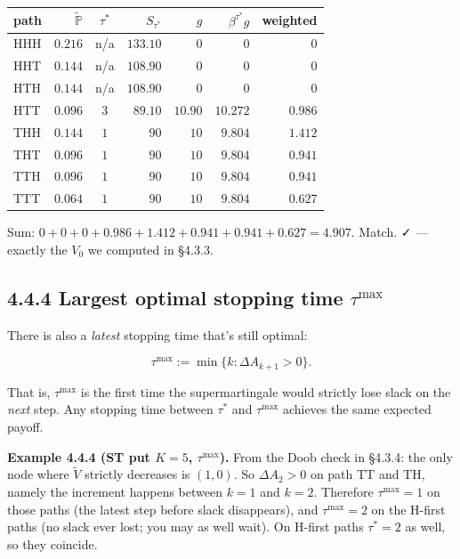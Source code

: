 \documentclass[
  10pt,
  twoside]{book}
\newcounter{none} %
\begin{document}
{\def\LTcaptype{none} %
\begin{table}[H]
\centering
\begin{tabular}{|l|r|c|r|r|r|r|}
\toprule
path & \(\tilde{\mathbb{P}}\) & \(\tau^*\) & \(S_{\tau^*}\) & \(g\) & \(\beta^{\tau^*}g\) & weighted \\
\midrule



HHH & \(0.216\) & n/a & \(133.10\) & \(0\) & \(0\) & \(0\) \\
HHT & \(0.144\) & n/a & \(108.90\) & \(0\) & \(0\) & \(0\) \\
HTH & \(0.144\) & n/a & \(108.90\) & \(0\) & \(0\) & \(0\) \\
HTT & \(0.096\) & \(3\) & \(89.10\) & \(10.90\) & \(10.272\) &
\(0.986\) \\
THH & \(0.144\) & \(1\) & \(90\) & \(10\) & \(9.804\) & \(1.412\) \\
THT & \(0.096\) & \(1\) & \(90\) & \(10\) & \(9.804\) & \(0.941\) \\
TTH & \(0.096\) & \(1\) & \(90\) & \(10\) & \(9.804\) & \(0.941\) \\
TTT & \(0.064\) & \(1\) & \(90\) & \(10\) & \(9.804\) & \(0.627\) \\
\bottomrule
\end{tabular}
\end{table}
}

Sum: \(0 + 0 + 0 + 0.986 + 1.412 + 0.941 + 0.941 + 0.627 = 4.907\).
Match. ✓ --- exactly the \(V_0\) we computed in §4.3.3.

\subsection{\texorpdfstring{4.4.4 Largest optimal stopping time
\(\tau^{\max}\)}{4.4.4 Largest optimal stopping time \textbackslash tau\^{}\{\textbackslash max\}}}\label{largest-optimal-stopping-time-taumax}

There is also a \emph{latest} stopping time that's still optimal:

\[\tau^{\max} := \min\{k : \Delta A_{k+1} > 0\}.\]

That is, \(\tau^{\max}\) is the first time the supermartingale would
strictly lose slack on the \emph{next} step. Any stopping time between
\(\tau^*\) and \(\tau^{\max}\) achieves the same expected payoff.

\textbf{Example 4.4.4 (ST put \(K = 5\), \(\tau^{\max}\)).} From the
Doob check in §4.3.4: the only node where \(\tilde V\) strictly
decreases is \((1, 0)\). So \(\Delta A_2 > 0\) on path TT and TH, namely
the increment happens between \(k=1\) and \(k=2\). Therefore
\(\tau^{\max} = 1\) on those paths (the latest step before slack
disappears), and \(\tau^{\max} = 2\) on the H-first paths (no slack ever
lost; you may as well wait). On H-first paths \(\tau^* = 2\) as well, so
they coincide.
\end{document}
